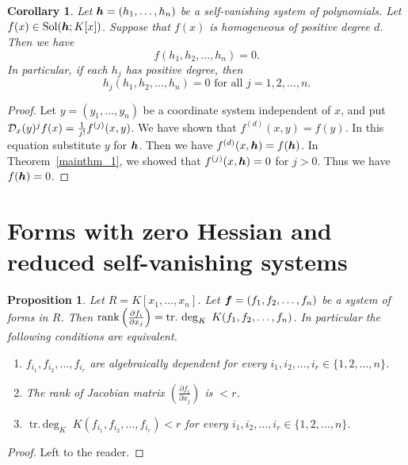 \documentclass[12pt]{article}
\newtheorem{corollary}[theorem]{Corollary}
\newtheorem{proposition}[theorem]{Proposition}
\theoremstyle{definition}
\theoremstyle{remark}
\def\rank{{\rm rank}}
\def\cD{{\cal D}}
\def\sol{{\rm Sol}}
\def\boldh{\mbox{\boldmath $h$}}
\def\boldf{\mbox{\boldmath $f$}}
\def\pa{\partial}
\def\trdeg{\operatorname{tr.\,deg}}
\begin{document}
\begin{corollary}  \label{second_meaning_of_self_vanishing}   %
Let $\boldh=(h_1, \ldots, h_n)$ be a self-vanishing system of polynomials. 
Let $f(x) \in \sol(\boldh; K[x])$.  
Suppose that $f(x)$ is homogeneous of positive degree $d$.  
Then we have 
\[f(h_1, h_2, \ldots, h_n)=0.\]
In particular, if each $h_j$ has positive degree, then  
\[h_j(h_1, h_2, \ldots, h_n)=0 \mbox{ for all } j=1,2, \ldots, n. \]
\end{corollary}

\begin{proof}
Let $y=(y_1, \ldots, y_n)$ be a coordinate system independent of $x$,  and put  
$\cD_x(y)^jf(x)=\frac{1}{j!}f^{(j)}(x,y)$.  We have shown that 
$f^{(d)}(x,y)=f(y)$.  In this equation substitute  $y$ for  $\boldh$.  Then we have 
$f^{(d)}(x,\boldh)=f(\boldh)$.   
In Theorem~\ref{mainthm_1}, we showed that 
$f^{(j)}(x, \boldh)=0$ for $j>0$. Thus we have $f(\boldh)=0$.        
\end{proof} 


\section{Forms with zero Hessian and reduced self-vanishing systems} 

\begin{proposition}   \label{basic_1}    %
Let $R=K[x_1, \ldots, x_n]$.  
Let 
$\boldf=(f_1, f_2, \ldots, f_n)$ be a system of forms in $R$.  
Then $\rank \left( \frac{\pa f_i}{\pa x_j} \right) = 
\trdeg_K\; K(f_1, f_2, \ldots, f_n)$.
In particular the following conditions are equivalent. 
\begin{enumerate}
\item[\upshape(1)]
$f_{i_1}, f_{i_2}, \ldots, f_{i_r}$ are algebraically dependent 
for every $i_1, i_2, \ldots, i_r \in \{1,2,\ldots,n\}$.
\item[\upshape(2)]
The rank of  Jacobian matrix $(\frac{\pa f_i}{\pa x_j})$ is $ < r$.
\item[\upshape(3)]
$\trdeg_K\; K(f_{i_1}, f_{i_2}, \ldots, f_{i_r}) < r$
for every $i_1, i_2, \ldots, i_r \in \{1,2,\ldots,n\}$.
\end{enumerate}
\end{proposition}

\begin{proof}
Left to the reader. 
\end{proof}
\end{document}
